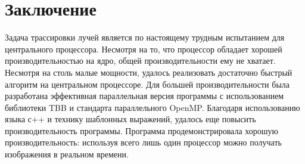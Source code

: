 \documentclass[12pt, a4paper]{article}
\begin{document}
\newpage
\section*{Заключение}
Задача трассировки лучей является по настоящему трудным испытанием для центрального процессора. Несмотря на то, что процессор обладает хорошей производительностью на ядро, общей производительности ему не хватает. Несмотря на столь малые мощности, удалось реализовать достаточно быстрый алгоритм на центральном процессоре. Для большей производительности была разработана эффективная параллельная версия программы с использованием библиотеки TBB и
стандарта параллельного OpenMP. Благодаря использованию языка с++ и технику шаблонных выражений, удалось еще повысить производительность программы. Программа продемонстрировала хорошую производительность: используя всего лишь один процессор можно получать изображения в реальном времени.

\end{document}
